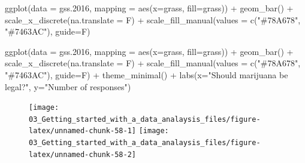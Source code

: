 \documentclass[
]{book}
\newenvironment{Shaded}{\begin{snugshade}}{\end{snugshade}}
\newcommand{\AttributeTok}[1]{\textcolor[rgb]{0.77,0.63,0.00}{#1}}
\newcommand{\FloatTok}[1]{\textcolor[rgb]{0.00,0.00,0.81}{#1}}
\newcommand{\FunctionTok}[1]{\textcolor[rgb]{0.00,0.00,0.00}{#1}}
\newcommand{\NormalTok}[1]{#1}
\newcommand{\SpecialCharTok}[1]{\textcolor[rgb]{0.00,0.00,0.00}{#1}}
\newcommand{\StringTok}[1]{\textcolor[rgb]{0.31,0.60,0.02}{#1}}
\begin{document}
\begin{Shaded}
\begin{Highlighting}[]
\FunctionTok{ggplot}\NormalTok{(}\AttributeTok{data =}\NormalTok{ gss}\FloatTok{.2016}\NormalTok{, }\AttributeTok{mapping =} \FunctionTok{aes}\NormalTok{(}\AttributeTok{x=}\NormalTok{grass, }\AttributeTok{fill=}\NormalTok{grass)) }\SpecialCharTok{+} \FunctionTok{geom\_bar}\NormalTok{() }\SpecialCharTok{+} 
  \FunctionTok{scale\_x\_discrete}\NormalTok{(}\AttributeTok{na.translate =}\NormalTok{ F) }\SpecialCharTok{+} 
  \FunctionTok{scale\_fill\_manual}\NormalTok{(}\AttributeTok{values =} \FunctionTok{c}\NormalTok{(}\StringTok{"\#78A678"}\NormalTok{, }\StringTok{"\#7463AC"}\NormalTok{), }\AttributeTok{guide=}\NormalTok{F)}

\FunctionTok{ggplot}\NormalTok{(}\AttributeTok{data =}\NormalTok{ gss}\FloatTok{.2016}\NormalTok{, }\AttributeTok{mapping =} \FunctionTok{aes}\NormalTok{(}\AttributeTok{x=}\NormalTok{grass, }\AttributeTok{fill=}\NormalTok{grass)) }\SpecialCharTok{+} \FunctionTok{geom\_bar}\NormalTok{() }\SpecialCharTok{+} 
  \FunctionTok{scale\_x\_discrete}\NormalTok{(}\AttributeTok{na.translate =}\NormalTok{ F) }\SpecialCharTok{+} 
  \FunctionTok{scale\_fill\_manual}\NormalTok{(}\AttributeTok{values =} \FunctionTok{c}\NormalTok{(}\StringTok{"\#78A678"}\NormalTok{, }\StringTok{"\#7463AC"}\NormalTok{), }\AttributeTok{guide=}\NormalTok{F) }\SpecialCharTok{+} 
  \FunctionTok{theme\_minimal}\NormalTok{() }\SpecialCharTok{+} 
  \FunctionTok{labs}\NormalTok{(}\AttributeTok{x=}\StringTok{"Should marijuana be legal?"}\NormalTok{, }\AttributeTok{y=}\StringTok{"Number of responses"}\NormalTok{)}
\end{Highlighting}
\end{Shaded}

\begin{figure}
\texttt{[image: 03\_Getting\_started\_with\_a\_data\_analaysis\_files/figure-latex/unnamed-chunk-58-1]} \texttt{[image: 03\_Getting\_started\_with\_a\_data\_analaysis\_files/figure-latex/unnamed-chunk-58-2]} \end{figure}
\end{document}

